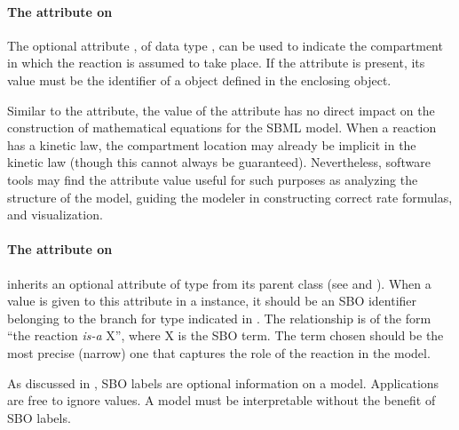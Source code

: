\paragraph{The  attribute on }
\label{sec:reaction-compartment}

The optional attribute , of data type
, can be used to indicate the compartment in
which the reaction is assumed to take place.  If the attribute is
present, its value must be the identifier of a \Compartment object
defined in the enclosing \Model object.

Similar to the  attribute, the value of the
 attribute has no direct impact on the
construction of mathematical equations for the SBML model.  When a
reaction has a kinetic law, the compartment location may already
be implicit in the kinetic law (though this cannot always be
guaranteed).  Nevertheless, software tools may find the
 attribute value useful for such purposes as
analyzing the structure of the model, guiding the modeler in
constructing correct rate formulas, and visualization.


\paragraph{The  attribute on }
\label{sec:reaction-sboterm}

\Reaction inherits an optional 
attribute of type  from its parent
class \SBase (see 
and ).  When a value is given to this
attribute in a  \Reaction instance, it should be an
SBO identifier belonging to the branch for type  \Reaction  
indicated in .  The relationship is
of the form ``the reaction \emph{is-a} X'', where X is
the SBO term.  The term chosen should be the most precise (narrow)
one that captures the role of the reaction in the model.

As discussed in , SBO labels are optional
information on a model.  Applications are free to ignore
 values.  A model must be interpretable without the
benefit of SBO labels.


\subsubsection{}
\label{subsec:simplespeciesreference}

